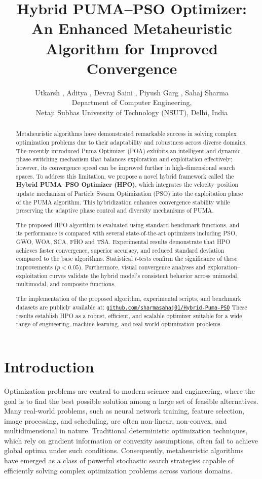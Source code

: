 \documentclass[a4paper,12pt]{article}
\title{\textbf{Hybrid PUMA--PSO Optimizer: An Enhanced Metaheuristic Algorithm for Improved Convergence}}
\author{
Utkarsh , Aditya , Devraj Saini , Piyush Garg , Sahaj Sharma\\[6pt]
\small Department of Computer Engineering,\\
\small Netaji Subhas University of Technology (NSUT), Delhi, India
}
\date{}
\begin{document}
\maketitle
\vspace{-1em}

\begin{abstract}
Metaheuristic algorithms have demonstrated remarkable success in solving complex optimization problems due to their adaptability and robustness across diverse domains. The recently introduced Puma Optimizer (POA) exhibits an intelligent and dynamic phase-switching mechanism that balances exploration and exploitation effectively; however, its convergence speed can be improved further in high-dimensional search spaces. To address this limitation, we propose a novel hybrid framework called the \textbf{Hybrid PUMA--PSO Optimizer (HPO)}, which integrates the velocity--position update mechanism of Particle Swarm Optimization (PSO) into the exploitation phase of the PUMA algorithm. This hybridization enhances convergence stability while preserving the adaptive phase control and diversity mechanisms of PUMA. 

The proposed HPO algorithm is evaluated using standard benchmark functions, and its performance is compared with several state-of-the-art optimizers including PSO, GWO, WOA, SCA, FHO and TSA. Experimental results demonstrate that HPO achieves faster convergence, superior accuracy, and reduced standard deviation compared to the base algorithms. Statistical $t$-tests confirm the significance of these improvements ($p < 0.05$). Furthermore, visual convergence analyses and exploration–exploitation curves validate the hybrid model’s consistent behavior across unimodal, multimodal, and composite functions. 

The implementation of the proposed algorithm, experimental scripts, and benchmark datasets are publicly available at:  
\small{\href{https://github.com/sharmasahaj01/Hybrid-Puma-PSO-Optimizer}{\texttt{github.com/sharmasahaj01/Hybrid-Puma-PSO}}}
These results establish HPO as a robust, efficient, and scalable optimizer suitable for a wide range of engineering, machine learning, and real-world optimization problems.
\end{abstract}



\section{Introduction}
Optimization problems are central to modern science and engineering, where the goal is to find the best possible solution among a large set of feasible alternatives. Many real-world problems, such as neural network training, feature selection, image processing, and scheduling, are often non-linear, non-convex, and multidimensional in nature. Traditional deterministic optimization techniques, which rely on gradient information or convexity assumptions, often fail to achieve global optima under such conditions. Consequently, metaheuristic algorithms have emerged as a class of powerful stochastic search strategies capable of efficiently solving complex optimization problems across various domains.
\end{document}

